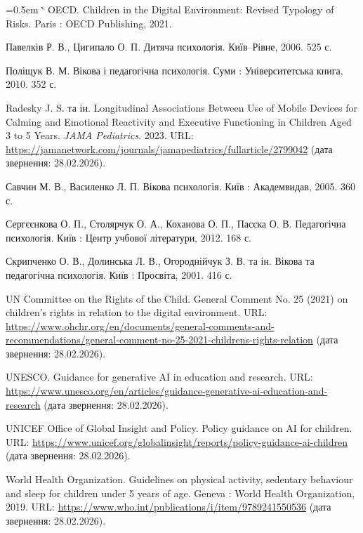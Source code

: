 \documentclass[14pt, a4paper]{extreport}
\makeatletter
\renewcommand{\@biblabel}[1]{#1.}
\renewenvironment{thebibliography}[1]
  {\list{\@biblabel{\arabic{enumiv}}}%
     {\settowidth\labelwidth{\@biblabel{#1}}%
      \leftmargin=1.25cm
      \labelsep=0.5em
      \itemsep=0.3\baselineskip
      \parsep=0pt
      \usecounter{enumiv}%
      \let\p@enumiv\@empty
      \renewcommand\theenumiv{\arabic{enumiv}}}%
   \sloppy\clubpenalty4000\widowpenalty4000\sfcode`\.\@m}
  {\endlist}
\makeatother
\begin{document}
\begin{thebibliography}{99}
OECD. Children in the Digital Environment: Revised Typology of Risks. Paris : OECD Publishing, 2021.

Павелків Р. В., Цигипало О. П. Дитяча психологія. Київ--Рівне, 2006. 525 с.

Поліщук В. М. Вікова і педагогічна психологія. Суми : Університетська книга, 2010. 352 с.

Radesky J. S. та ін. Longitudinal Associations Between Use of Mobile Devices for Calming and Emotional Reactivity and Executive Functioning in Children Aged 3 to 5 Years. \textit{JAMA Pediatrics}. 2023. URL: \url{https://jamanetwork.com/journals/jamapediatrics/fullarticle/2799042} (дата звернення: 28.02.2026).

Савчин М. В., Василенко Л. П. Вікова психологія. Київ : Академвидав, 2005. 360 с.

Сергєєнкова О. П., Столярчук О. А., Коханова О. П., Пасєка О. В. Педагогічна психологія. Київ : Центр учбової літератури, 2012. 168 с.

Скрипченко О. В., Долинська Л. В., Огороднійчук З. В. та ін. Вікова та педагогічна психологія. Київ : Просвіта, 2001. 416 с.

UN Committee on the Rights of the Child. General Comment No. 25 (2021) on children’s rights in relation to the digital environment. URL: \url{https://www.ohchr.org/en/documents/general-comments-and-recommendations/general-comment-no-25-2021-childrens-rights-relation} (дата звернення: 28.02.2026).

UNESCO. Guidance for generative AI in education and research. URL: \url{https://www.unesco.org/en/articles/guidance-generative-ai-education-and-research} (дата звернення: 28.02.2026).

UNICEF Office of Global Insight and Policy. Policy guidance on AI for children. URL: \url{https://www.unicef.org/globalinsight/reports/policy-guidance-ai-children} (дата звернення: 28.02.2026).

World Health Organization. Guidelines on physical activity, sedentary behaviour and sleep for children under 5 years of age. Geneva : World Health Organization, 2019. URL: \url{https://www.who.int/publications/i/item/9789241550536} (дата звернення: 28.02.2026).

\end{thebibliography}
\end{document}
